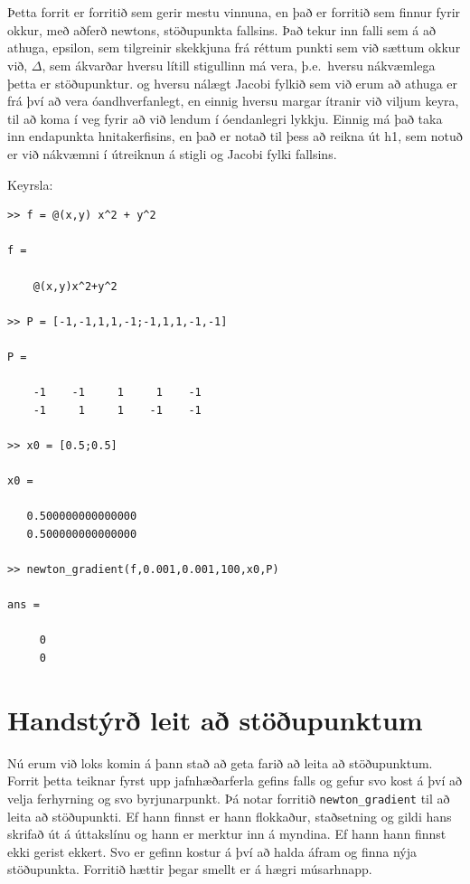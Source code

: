 \documentclass[a4]{article}
\begin{document}
\begin{flushright}
\section{}
Þetta forrit er forritið sem gerir mestu vinnuna, en það er forritið sem finnur fyrir okkur, með aðferð newtons, stöðupunkta fallsins. Það tekur inn falli sem á að athuga,
epsilon, sem tilgreinir skekkjuna frá réttum punkti sem við sættum okkur við,
$\Delta$, sem ákvarðar hversu lítill stigullinn má vera, þ.e.\ hversu nákvæmlega þetta er stöðupunktur.
og hversu nálægt Jacobi fylkið sem við erum að athuga er frá því að vera óandhverfanlegt,
en einnig hversu margar ítranir við viljum keyra, til að koma í veg fyrir að við lendum í óendanlegri lykkju.
Einnig má það taka inn endapunkta hnitakerfisins, en það er notað til þess að reikna út h1, sem notuð er  við nákvæmni í útreiknun á stigli og Jacobi fylki fallsins.



Keyrsla:
\begin{lstlisting}
>> f = @(x,y) x^2 + y^2

f = 

    @(x,y)x^2+y^2

>> P = [-1,-1,1,1,-1;-1,1,1,-1,-1]

P =

    -1    -1     1     1    -1
    -1     1     1    -1    -1

>> x0 = [0.5;0.5]

x0 =

   0.500000000000000
   0.500000000000000

>> newton_gradient(f,0.001,0.001,100,x0,P)

ans =

     0
     0

\end{lstlisting}


\section{Handstýrð leit að stöðupunktum}

Nú erum við loks komin á þann stað að geta farið að leita að stöðupunktum. Forrit þetta teiknar fyrst upp jafnhæðarferla gefins falls og gefur svo kost á því að velja ferhyrning og svo byrjunarpunkt. Þá notar forritið \lstinline{newton_gradient} til að leita að stöðupunkti. Ef hann finnst er hann flokkaður, staðsetning og gildi hans skrifað út á úttakslínu og hann er merktur inn á myndina. Ef hann hann finnst ekki gerist ekkert. Svo er gefinn kostur á því að halda áfram og finna nýja stöðupunkta. Forritið hættir þegar smellt er á hægri músarhnapp.


\end{flushright}
\end{document}
